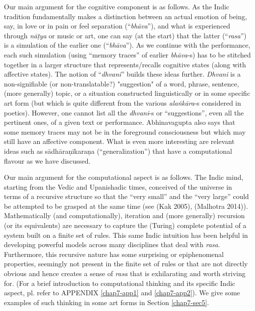 Our main argument for the cognitive component is as follows. As the Indic tradition fundamentally makes a distinction between an actual emotion of being, say, in love or in pain or feel separation (“\textsl{bhāva}”), and what is experienced through \textsl{nāṭya} or music or art, one can say (at the start) that the latter (“\textsl{rasa}”) is a simulation of the earlier one (“\textsl{bhāva}”). As we continue with the performance, each such simulation (using “memory traces” of earlier \textsl{bhāva}-s) has to be stitched together in a larger structure that represents/recalls cognitive states (along with affective states). The notion of “\textsl{dhvani}” builds these ideas further. \textsl{Dhvani} is a non-signifiable (or non-translatable?) "suggestion" of a word, phrase, sentence, (more generally) topic, or a situation constructed linguistically or in some specific art form (but which is quite different from the various \textsl{alaṅkāra}-s considered in poetics). However, one cannot list all the \textsl{dhvani}-s or “suggestions”, even all the pertinent ones, of a given text or performance. Abhinavagupta also says that some memory traces may not be in the foreground consciousness but which may still have an affective component. What is even more interesting are relevant ideas such as sādhāraṇīkaraṇa (“generalization”) that have a computational flavour as we have discussed.

Our main argument for the computational aspect is as follows. The Indic mind, starting from the Vedic and Upanishadic times, conceived of the universe in terms of a recursive structure so that the “very small” and the “very large” could be attempted to be grasped at the same time (see (Kak 2005), (Malhotra 2014)). Mathematically (and computationally), iteration and (more generally) recursion (or its equivalents) are necessary to capture the (Turing) complete potential of a system built on a finite set of rules. This same Indic intuition has been helpful in developing powerful models across many disciplines that deal with \textsl{rasa}. Furthermore, this recursive nature has some surprising or epiphenomenal properties, seemingly not present in the finite set of rules or that are not directly obvious and hence creates a sense of \textsl{rasa} that is exhilarating and worth striving for. (For a brief introduction to computational thinking and its specific Indic aspect, pl. refer to APPENDIX \ref{chap7-app1} and \ref{chap7-app2}). We give some examples of such thinking in some art forms in Section \ref{chap7-sec5}.


